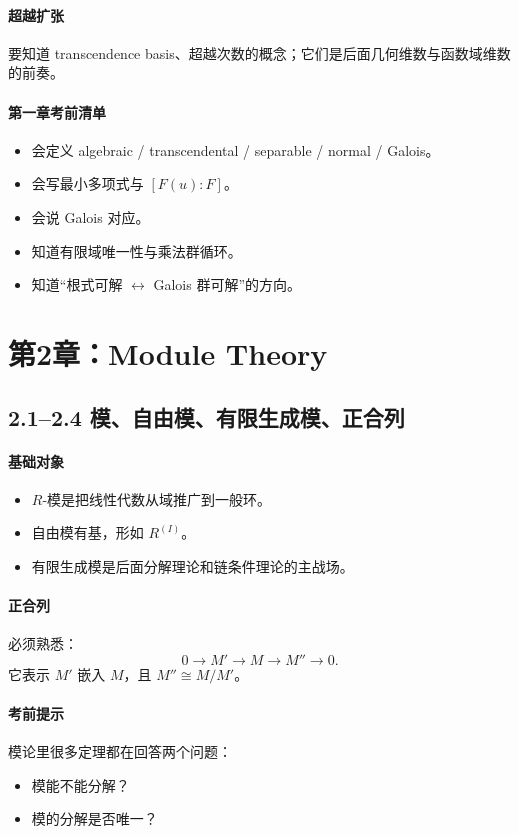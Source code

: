 \documentclass[a4paper]{ctexart}
\begin{document}
\paragraph{超越扩张}
要知道 transcendence basis、超越次数的概念；它们是后面几何维数与函数域维数的前奏。

\paragraph{第一章考前清单}
\begin{itemize}
  \item 会定义 algebraic / transcendental / separable / normal / Galois。
  \item 会写最小多项式与 \([F(u):F]\)。
  \item 会说 Galois 对应。
  \item 知道有限域唯一性与乘法群循环。
  \item 知道“根式可解 \(\leftrightarrow\) Galois 群可解”的方向。
\end{itemize}

\section{第2章：Module Theory}

\subsection{2.1--2.4 模、自由模、有限生成模、正合列}

\paragraph{基础对象}
\begin{itemize}
  \item \(R\)-模是把线性代数从域推广到一般环。
  \item 自由模有基，形如 \(R^{(I)}\)。
  \item 有限生成模是后面分解理论和链条件理论的主战场。
\end{itemize}

\paragraph{正合列}
必须熟悉：
\[
0\to M'\to M\to M''\to 0.
\]
它表示 \(M'\) 嵌入 \(M\)，且 \(M''\cong M/M'\)。

\paragraph{考前提示}
模论里很多定理都在回答两个问题：
\begin{itemize}
  \item 模能不能分解？
  \item 模的分解是否唯一？
\end{itemize}
\end{document}
